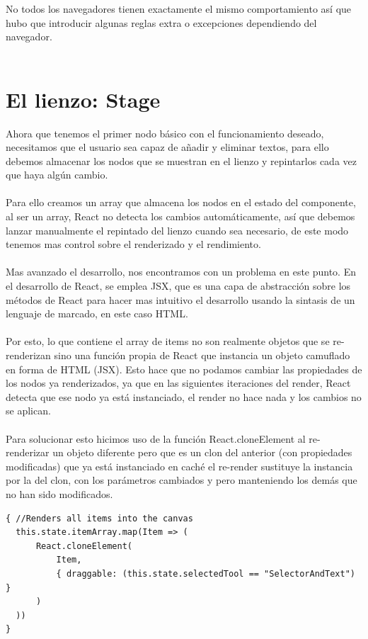 No todos los navegadores tienen exactamente el mismo comportamiento así que hubo que 
introducir algunas reglas extra o excepciones dependiendo del navegador. 
\\\\

\section{El lienzo: Stage}

Ahora que tenemos el primer nodo básico con el funcionamiento deseado, necesitamos que
el usuario sea capaz de añadir y eliminar textos, para ello debemos almacenar los 
nodos que se muestran en el lienzo y repintarlos cada vez que haya algún cambio.
\\\\
Para ello creamos un array que almacena los nodos en el estado del componente, al ser 
un array, React no detecta los cambios automáticamente, así que debemos lanzar manualmente
el repintado del lienzo cuando sea necesario, de este modo tenemos mas control sobre 
el renderizado y el rendimiento.
\\\\
Mas avanzado el desarrollo, nos encontramos con un problema en este punto. En el desarrollo
de React, se emplea JSX\cite{JSX}, que es una capa de abstracción sobre los métodos de React 
para hacer mas intuitivo el desarrollo usando la sintasis de un lenguaje de marcado,
en este caso HTML.
\\\\
Por esto, lo que contiene el array de items no son realmente objetos que se re-renderizan
sino una función propia de React que instancia un objeto camuflado en forma de HTML (JSX\cite{JSX}).
Esto hace que no podamos cambiar las propiedades de los nodos ya renderizados, ya que
en las siguientes iteraciones del render, React detecta que ese nodo ya está instanciado,
el render no hace nada y los cambios no se aplican. 
\\\\
Para solucionar esto hicimos uso de la función React.cloneElement al re-renderizar
un objeto diferente pero que es un clon del anterior (con propiedades modificadas)
que ya está instanciado en caché el re-render sustituye la instancia por la del clon,
con los parámetros cambiados y pero manteniendo los demás que no han sido modificados.

\begin{lstlisting}[caption={Render del array de nodos}]
{ //Renders all items into the canvas
  this.state.itemArray.map(Item => (
      React.cloneElement(
          Item,
          { draggable: (this.state.selectedTool == "SelectorAndText") }
      )
  ))
}
\end{lstlisting}

